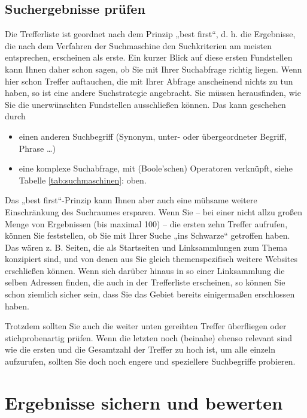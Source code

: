 \documentclass[]{book}
\providecommand{\tightlist}{%
  \setlength{\itemsep}{0pt}\setlength{\parskip}{0pt}}
\theoremstyle{definition}
\theoremstyle{definition}
\theoremstyle{definition}
\theoremstyle{remark}
\begin{document}
\subsection{Suchergebnisse prüfen}\label{suchergebnisse-prufen}

Die Trefferliste ist geordnet nach dem Prinzip „best first``, d. h. die
Ergebnisse, die nach dem Verfahren der Suchmaschine den Suchkriterien am
meisten entsprechen, erscheinen als erste. Ein kurzer Blick auf diese
ersten Fundstellen kann Ihnen daher schon sagen, ob Sie mit Ihrer
Suchabfrage richtig liegen. Wenn hier schon Treffer auftauchen, die mit
Ihrer Abfrage anscheinend nichts zu tun haben, so ist eine andere
Suchstrategie angebracht. Sie müssen herausfinden, wie Sie die
unerwünschten Fundstellen ausschließen können. Das kann geschehen durch

\begin{itemize}
\tightlist
\item
  einen anderen Suchbegriff (Synonym, unter- oder übergeordneter
  Begriff, Phrase \ldots{})
\item
  eine komplexe Suchabfrage, mit (Boole'schen) Operatoren verknüpft,
  siehe Tabelle \ref{tab:suchmaschinen}: oben.
\end{itemize}

Das „best first``-Prinzip kann Ihnen aber auch eine mühsame weitere
Einschränkung des Suchraumes ersparen. Wenn Sie -- bei einer nicht allzu
großen Menge von Ergebnissen (bis maximal 100) -- die ersten zehn
Treffer aufrufen, können Sie feststellen, ob Sie mit Ihrer Suche „ins
Schwarze`` getroffen haben. Das wären z. B. Seiten, die als Startseiten
und Linksammlungen zum Thema konzipiert sind, und von denen aus Sie
gleich themenspezifisch weitere Websites erschließen können. Wenn sich
darüber hinaus in so einer Linksammlung die selben Adressen finden, die
auch in der Trefferliste erscheinen, so können Sie schon ziemlich sicher
sein, dass Sie das Gebiet bereits einigermaßen erschlossen haben.

Trotzdem sollten Sie auch die weiter unten gereihten Treffer überfliegen
oder stichprobenartig prüfen. Wenn die letzten noch (beinahe) ebenso
relevant sind wie die ersten und die Gesamtzahl der Treffer zu hoch ist,
um alle einzeln aufzurufen, sollten Sie doch noch engere und speziellere
Suchbegriffe probieren.

\section{Ergebnisse sichern und
bewerten}\label{ergebnisse-sichern-und-bewerten}
\end{document}
